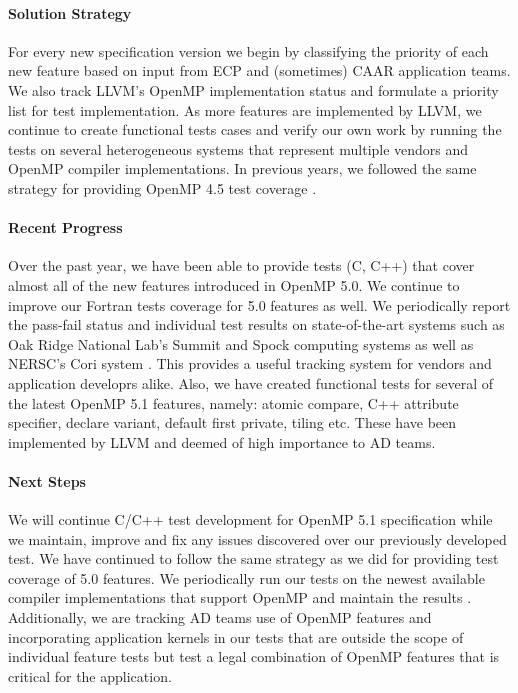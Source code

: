 \paragraph{Solution Strategy}
 For every new specification version we begin by classifying the priority of each new feature based on input from ECP and (sometimes) CAAR application teams. We also track LLVM's OpenMP implementation status and formulate a priority list for test implementation. As more features are implemented by LLVM, we continue to create functional tests cases and verify our own work by running the tests on several heterogeneous systems that represent multiple vendors and OpenMP compiler implementations. In previous years, we followed the same strategy for providing OpenMP 4.5 test coverage \cite{vandv2019}.

\paragraph{Recent Progress}
Over the past year, we have been able to provide tests (C, C++) that cover almost all of the new features introduced in OpenMP 5.0. We continue to improve our Fortran tests coverage for 5.0 features as well. We periodically report the pass-fail status and individual test results on state-of-the-art systems such as Oak Ridge National Lab's Summit and Spock computing systems as well as NERSC's Cori system \cite{sollvevvwebsite}. This provides a useful tracking system for vendors and application developrs alike. Also, we have created functional tests for several of the latest OpenMP 5.1 features, namely: atomic compare, C++ attribute specifier, declare variant, default first private, tiling etc. These have been implemented by LLVM and deemed of high importance to AD teams. 

\paragraph{Next Steps}
We will continue C/C++ test development for OpenMP 5.1 specification while we maintain, improve and fix any issues discovered over our previously developed test. We have continued to follow the same strategy as we did for providing test coverage of 5.0 features. We periodically run our tests on the newest available compiler implementations that support OpenMP and maintain the results \cite{sollvevvwebsite}. Additionally, we are tracking AD teams use of OpenMP features and incorporating application kernels in our tests that are outside the scope of individual feature tests but test a legal combination of OpenMP features that is critical for the application.